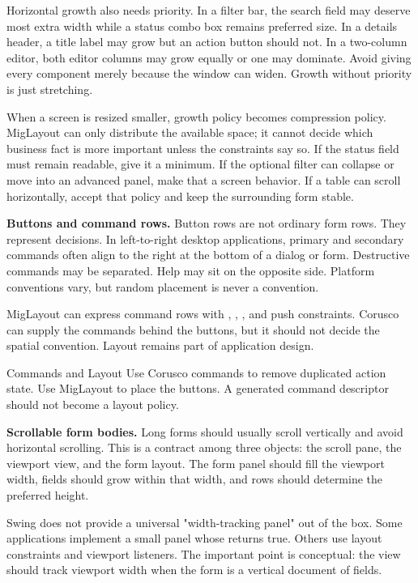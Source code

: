 Horizontal growth also needs priority. In a filter bar, the search field may
deserve most extra width while a status combo box remains preferred size. In a
details header, a title label may grow but an action button should not. In a
two-column editor, both editor columns may grow equally or one may dominate.
Avoid giving every component  merely because the window can widen.
Growth without priority is just stretching.

When a screen is resized smaller, growth policy becomes compression policy.
MigLayout can only distribute the available space; it cannot decide which
business fact is more important unless the constraints say so. If the status
field must remain readable, give it a minimum. If the optional filter can
collapse or move into an advanced panel, make that a screen behavior. If a table
can scroll horizontally, accept that policy and keep the surrounding form
stable.

\textbf{Buttons and command rows.}
Button rows are not ordinary form rows. They represent decisions. In left-to-right desktop applications, primary and secondary commands often align to the right at the bottom of a dialog or form. Destructive commands may be separated. Help may sit on the opposite side. Platform conventions vary, but random placement is never a convention.

MigLayout can express command rows with , , , and push constraints. Corusco can supply the commands behind the buttons, but it should not decide the spatial convention. Layout remains part of application design.

\begin{coruscobox}{Commands and Layout}
Use Corusco commands to remove duplicated action state. Use MigLayout to place the buttons. A generated command descriptor should not become a layout policy.
\end{coruscobox}

\textbf{Scrollable form bodies.}
Long forms should usually scroll vertically and avoid horizontal scrolling. This is a contract among three objects: the scroll pane, the viewport view, and the form layout. The form panel should fill the viewport width, fields should grow within that width, and rows should determine the preferred height.

Swing does not provide a universal "width-tracking panel" out of the box. Some applications implement a small  panel whose  returns true. Others use layout constraints and viewport listeners. The important point is conceptual: the view should track viewport width when the form is a vertical document of fields.

